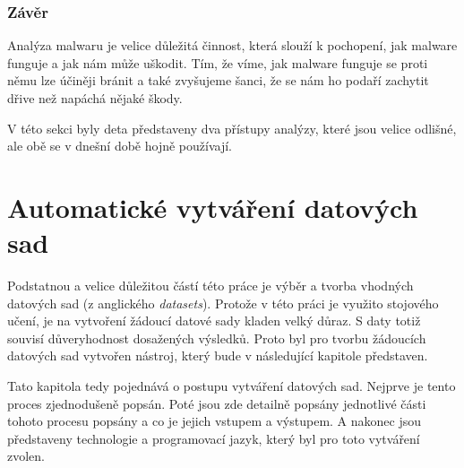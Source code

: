 \subsection*{Závěr}
Analýza malwaru je velice důležitá činnost, která slouží k pochopení, jak malware funguje a jak nám může uškodit. Tím, že víme, jak malware funguje se proti němu lze účiněji bránit a také zvyšujeme šanci, že se nám ho 
podaří zachytit dřive než napáchá nějaké škody. 

V této sekci byly deta představeny dva přístupy analýzy, které jsou velice odlišné, ale obě se v dnešní době hojně používají.


\chapter{Automatické vytváření datových sad} \label{3.chap}

Podstatnou a velice důležitou částí této práce je výběr a tvorba vhodných datových sad (z anglického \textit{datasets}).
Protože v této práci je využito stojového učení, je na vytvoření žádoucí datové sady kladen velký důraz. 
S daty totiž souvisí důveryhodnost dosažených výsledků.
Proto byl pro tvorbu žádoucích datových sad vytvořen nástroj, který bude v následující kapitole představen. 

Tato kapitola tedy pojednává o postupu vytváření datových sad. Nejprve je tento proces zjednodušeně popsán.
Poté jsou zde detailně popsány jednotlivé části tohoto procesu popsány a co je jejich vstupem a výstupem.
A nakonec jsou představeny technologie a programovací jazyk, který byl pro toto vytváření zvolen. 

